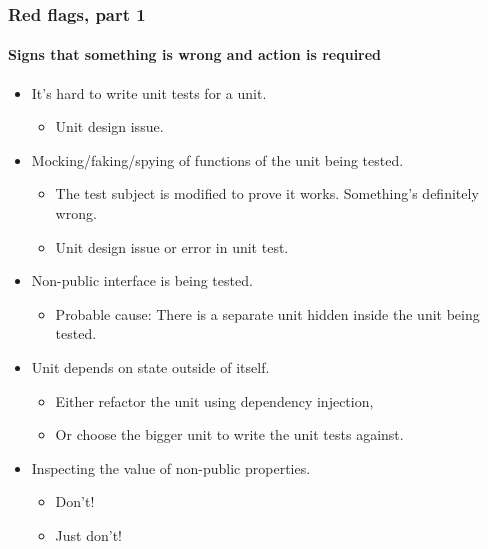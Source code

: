 \begin{frame}
	\frametitle{Red flags, part 1}
	\framesubtitle{Signs that something is wrong and action is required}

	\begin{itemize}[<+-| highlight@+>]
		\item It's hard to write unit tests for a unit.
		\begin{itemize}[<+-| highlight@+>]
			\item Unit design issue.
		\end{itemize}
		\item Mocking/faking/spying of functions of the unit being tested.
		\begin{itemize}[<+-| highlight@+>]
			\item The test subject is modified to prove it works. Something's definitely wrong.
			\item Unit design issue or error in unit test.
		\end{itemize}
		\item Non-public interface is being tested.
		\begin{itemize}[<+-| highlight@+>]
			\item Probable cause: There is a separate unit hidden inside the unit being tested.
		\end{itemize}
		\item Unit depends on state outside of itself.
		\begin{itemize}[<+-| highlight@+>]
			\item Either refactor the unit using dependency injection,
			\item Or choose the bigger unit to write the unit tests against.
		\end{itemize}
		\item Inspecting the value of non-public properties.
		\begin{itemize}[<+-| highlight@+>]
			\item Don't!
			\item Just don't!
		\end{itemize}
	\end{itemize}
\end{frame}


